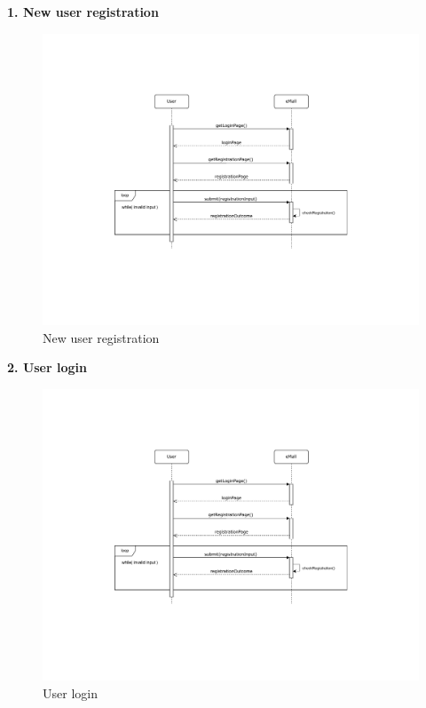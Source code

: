 \documentclass[11pt]{article}
\begin{document}
\begin{description}
    \item \textbf{1. New user registration}
    \begin{figure}[!ht]
        \centering
        \includegraphics[page={1}, trim=5cm 5.6cm 5cm 4.4cm, width=0.8\linewidth, clip]{SequenceDiagrams.pdf}
        \caption{New user registration}
    \end{figure}
    
    \newpage
    
    \item \textbf{2. User login}
    \begin{figure}[!ht]
        \centering
        \includegraphics[page={2}, trim=5cm 9cm 5cm 3.6cm, width=0.8\linewidth, clip]{SequenceDiagrams.pdf}
        \caption{User login}
    \end{figure}
    

\end{description}
\end{document}

